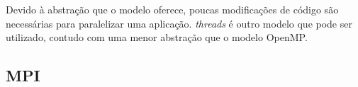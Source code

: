 Devido à abstração que o modelo oferece, poucas modificações de código são
necessárias para paralelizar uma aplicação. \posix \textit{threads} é outro
modelo que pode ser utilizado, contudo com uma menor abstração que o modelo
OpenMP.


\subsection{MPI}

%
%
%

